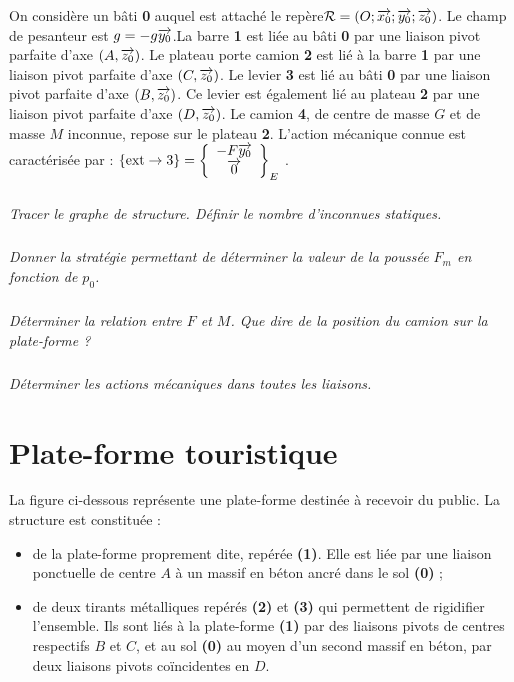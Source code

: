 \documentclass[10pt,fleqn]{article} %
\begin{document}
\begin{multicols}{2}
\setcounter{exo}{0}
On considère un bâti \textbf{0} auquel est attaché le repère$\mathcal{R}=\left(O;\overrightarrow{x_0};\overrightarrow{y_0};\overrightarrow{z_0} \right)$. Le champ de pesanteur est $g=-g\overrightarrow{y_0}$.La barre \textbf{1} est liée au bâti \textbf{0} par une liaison pivot parfaite d’axe $\left(A,\overrightarrow{z_0}\right)$. Le plateau porte camion \textbf{2} est lié à la barre \textbf{1} par une liaison pivot parfaite d’axe $\left(C,\overrightarrow{z_0}\right)$. Le levier \textbf{3} est lié au bâti \textbf{0} par une liaison pivot parfaite d’axe $\left(B,\overrightarrow{z_0}\right)$. Ce levier est également lié au plateau \textbf{2} par une liaison pivot parfaite d’axe $\left(D,\overrightarrow{z_0}\right)$. Le camion \textbf{4}, de centre de masse $G$ et de masse $M$ inconnue, repose sur le plateau \textbf{2}.
L’action mécanique connue est caractérisée par : $\{\text{ext}\rightarrow 3\}=\left\{
\begin{array}{c}
-F\overrightarrow{y_0} \\
\overrightarrow{0} \\
\end{array}
\right\}_E$ .




\subparagraph{}\textit{Tracer le graphe de structure. Définir le nombre d'inconnues statiques.}

\subparagraph{}\textit{Donner la stratégie permettant de déterminer la valeur de la poussée $F_m$ en fonction de $p_0$.}

\subparagraph{}\textit{Déterminer la relation entre $F$ et $M$. Que dire de la position du camion sur la plate-forme ?}

\subparagraph{}\textit{Déterminer les actions mécaniques dans toutes les liaisons.}


\section*{Plate-forme touristique}
\setcounter{exo}{0}

La figure ci-dessous représente une plate-forme destinée à recevoir du public. La structure est constituée :
\begin{itemize}
\item de la plate-forme proprement dite, repérée \textbf{(1)}. Elle est liée par une liaison ponctuelle de centre $A$ à un massif en béton ancré dans le sol \textbf{(0)} ;
\item de deux tirants métalliques repérés \textbf{(2)} et \textbf{(3)} qui permettent de rigidifier l’ensemble. Ils sont liés à la plate-forme \textbf{(1)} par des liaisons pivots de centres respectifs $B$ et $C$, et au sol \textbf{(0)} au moyen d’un second massif en béton, par deux liaisons pivots coïncidentes en $D$.
\end{itemize}


\end{multicols}
\end{document}

